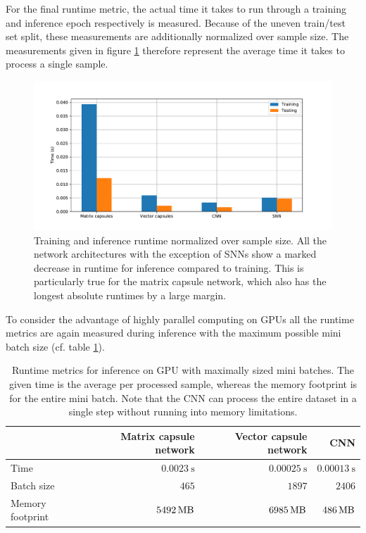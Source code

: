 For the final runtime metric, the actual time it takes to run through a training and inference epoch respectively is measured. Because of the uneven train/test set split, these measurements are additionally normalized over sample size. The measurements given in figure \ref{fig:runtime} therefore represent the average time it takes to process a single sample.
\begin{figure}[H]
    \centering
\includegraphics[clip,trim=1.3cm 0 2.5cm 1cm,width=\textwidth]{figures/runtime.pdf}
\caption[Training and inference runtime normalized over sample size]{Training and inference runtime normalized over sample size. All the network architectures with the exception of SNNs show a marked decrease in runtime for inference compared to training. This is particularly true for the matrix capsule network, which also has the longest absolute runtimes by a large margin.}\label{fig:runtime}
\end{figure}\noindent
To consider the advantage of highly parallel computing on GPUs all the runtime metrics are again measured during inference with the maximum possible mini batch size (cf. table \ref{tab:runtime}). 
\begin{table}[H]
\centering
\begin{tabular}{@{}lrrr@{}}
\toprule
                 & Matrix capsule network & Vector capsule network & CNN                   \\ \midrule
Time             & $\SI{0.0023}{\second}$   & $\SI{0.00025}{\second}$    & $\SI{0.00013}{\second}$ \\
Batch size       & $\num{465}$            & $\num{1897}$           & $\num{2406}$          \\
Memory footprint & $\SI{5492}{\mega\byte}$         & $\SI{6985}{\mega\byte}$         & $\SI{486}{\mega\byte}$         \\ \bottomrule
\end{tabular}
\caption[Runtime metrics for inference on GPU with maximally sized mini batches]{Runtime metrics for inference on GPU with maximally sized mini batches. The given time is the average per processed sample, whereas the memory footprint is for the entire mini batch. Note that the CNN can process the entire dataset in a single step without running into memory limitations.}
\label{tab:runtime}
\end{table}
